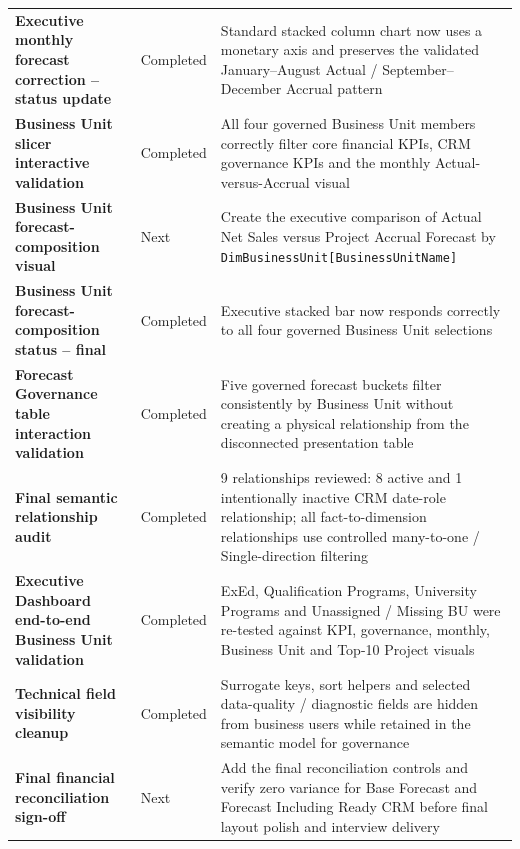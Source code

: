 \documentclass[11pt,a4paper]{article}
\begin{document}
\begin{tabularx}{\textwidth}{
    >{\bfseries}p{5.8cm}
    p{2.8cm}
    X
}
Executive monthly forecast correction -- status update
&
Completed
&
Standard stacked column chart now uses a monetary axis and preserves the validated
January--August Actual / September--December Accrual pattern
\\

Business Unit slicer interactive validation
&
Completed
&
All four governed Business Unit members correctly filter core financial KPIs,
CRM governance KPIs and the monthly Actual-versus-Accrual visual
\\

Business Unit forecast-composition visual
&
Next
&
Create the executive comparison of Actual Net Sales versus Project Accrual Forecast
by \texttt{DimBusinessUnit[BusinessUnitName]}
\\


Business Unit forecast-composition status -- final
&
Completed
&
Executive stacked bar now responds correctly to all four governed Business Unit selections
\\

Forecast Governance table interaction validation
&
Completed
&
Five governed forecast buckets filter consistently by Business Unit without creating
a physical relationship from the disconnected presentation table
\\

Final semantic relationship audit
&
Completed
&
9 relationships reviewed: 8 active and 1 intentionally inactive CRM date-role relationship;
all fact-to-dimension relationships use controlled many-to-one / Single-direction filtering
\\

Executive Dashboard end-to-end Business Unit validation
&
Completed
&
ExEd, Qualification Programs, University Programs and Unassigned / Missing BU were
re-tested against KPI, governance, monthly, Business Unit and Top-10 Project visuals
\\

Technical field visibility cleanup
&
Completed
&
Surrogate keys, sort helpers and selected data-quality / diagnostic fields are hidden
from business users while retained in the semantic model for governance
\\

Final financial reconciliation sign-off
&
Next
&
Add the final reconciliation controls and verify zero variance for Base Forecast and
Forecast Including Ready CRM before final layout polish and interview delivery
\\

\bottomrule

\end{tabularx}
\end{document}

